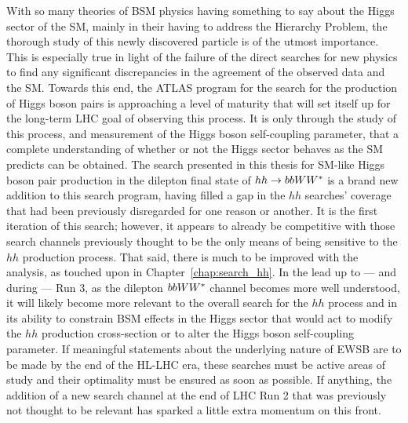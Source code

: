 With so many theories of BSM physics having something to say about the Higgs sector of the SM, mainly in their
having to address the Hierarchy Problem, the thorough study of this newly discovered particle
is of the utmost importance.
This is especially true in light of the failure of the direct searches for new physics to find any significant discrepancies
in the agreement of the observed data and the SM.
Towards this end, the ATLAS program for the search for the production of Higgs boson pairs is approaching
a level of maturity that will set itself up for the long-term LHC goal of observing this process.
It is only through the study of this process, and measurement of the Higgs boson self-coupling parameter, that a complete understanding of whether or not the Higgs sector behaves
as the SM predicts can be obtained.
The search presented in this thesis for SM-like Higgs boson pair production in the dilepton final state of $hh \rightarrow bbWW^*$
is a brand new addition to this search program, having filled a gap in the $hh$ searches' coverage that had
been previously disregarded for one reason or another.
It is the first iteration of this search; however, it appears to already be competitive with those search channels
previously thought to be the only means of being sensitive to the $hh$ production process.
That said, there is much to be improved with the analysis, as touched upon in Chapter~\ref{chap:search_hh}.
In the lead up to --- and during --- Run 3,
as the dilepton $bbWW^*$ channel becomes more well understood,
it will likely become more relevant to the overall search for the $hh$ process and in its ability
to constrain BSM effects in the Higgs sector that would act to modify the $hh$ production cross-section
or to alter the Higgs boson self-coupling parameter.
If meaningful statements about the underlying nature of EWSB
are to be made by the end of the HL-LHC era,
these searches must be active areas of study and their optimality must be ensured as soon as possible.
If anything, the addition of a new search channel at the end of LHC Run 2 that was previously not thought to be
relevant has sparked a little extra momentum on this front.
